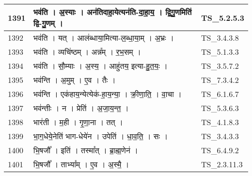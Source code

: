 \documentclass[17pt]{extarticle}
\begin{document}
\begin{longtable}{||p{0.4in}||p{4.9in}||p{0.9in}||}
    1391 & भव॑ति   ।   अ॒स्याः   ।   अन॑तिदाहा॒येत्यन॑ति{-}दा॒हा॒य॒   ।   द्वि॒गु॒णमिति॑ द्वि{-}गु॒णम्   ।    & TS\_5.2.5.3       \\
    
    \hline
        
    1392 & भव॑ति   ।   यत्   ।   आल॑ब्धाया॒मित्या{-}ल॒ब्धा॒या॒म्   ।   अ॒भ्रः   ।    & TS\_3.4.3.8       \\
    
    \hline
        
    1393 & भव॑ति   ।   व्यचि॑ष्ठम्   ।   अन्न᳚म्   ।   र॒भ॒सम्   ।    & TS\_5.1.3.3       \\
    
    \hline
        
    1394 & भव॑ति   ।   सौ॒म्याः   ।   अ॒स्य॒   ।   आहु॑तय॒ इत्या{-}हु॒त॒यः॒   ।    & TS\_3.5.7.2       \\
    
    \hline
        
    1395 & भव॑न्ति   ।   अ॒मुम्   ।   ए॒व   ।   तैः   ।    & TS\_7.3.4.2       \\
    
    \hline
        
    1396 & भव॑न्ति   ।   एक॑हाय॒न्येत्येक॑{-}हा॒य॒न्या॒   ।   क्री॒णा॒ति॒   ।   वा॒चा   ।    & TS\_6.1.6.7       \\
    
    \hline
        
    1397 & भव॑न्तीः   ।   न   ।   प्रेति॑   ।   अ॒जा॒य॒न्त॒   ।    & TS\_5.3.6.3       \\
    
    \hline
        
    1398 & भार॑ती   ।   म॒ही   ।   गृ॒णा॒ना   ।   तत्   ।    & TS\_4.1.8.3       \\
    
    \hline
        
    1399 & भा॒ग॒धेये॒नेति॑ भाग{-}धेये॑न   ।   उपेति॑   ।   धा॒व॒ति॒   ।   सः   ।    & TS\_3.4.3.3       \\
    
    \hline
        
    1400 & भि॒षजौ᳚   ।   इति॑   ।   तस्मा᳚त्   ।   ब्रा॒ह्म॒णेन॑   ।    & TS\_6.4.9.2       \\
    
    \hline
        
    1401 & भि॒षजौ᳚   ।   ताभ्या᳚म्   ।   ए॒व   ।   अ॒स्मै॒   ।    & TS\_2.3.11.3       \\
    

\end{longtable}
\end{document}
